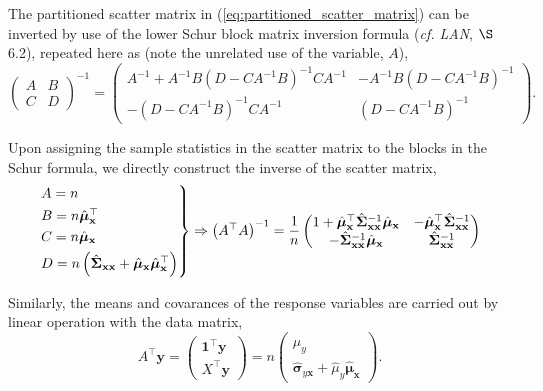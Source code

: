 \documentclass[12pt, twoside, draft]{article}
\begin{document}
The partitioned scatter matrix in (\ref{eq:partitioned_scatter_matrix}) can be inverted by use of the lower Schur block matrix inversion formula (\textit{cf. LAN}, $\S$6.2), repeated here as (note the unrelated use of the variable, $A$),
\begin{equation}\label{eq:block_matrix_inverse_lower}
\begin{pmatrix}
A & B \\
C & D
\end{pmatrix}^{-1} = 
\begin{pmatrix}
A^{-1} + A^{-1}B \left( D - CA^{-1}B \right)^{-1} CA^{-1} & -A^{-1}B \left( D - CA^{-1}B \right)^{-1} \\
-\left( D - CA^{-1}B \right)^{-1}CA^{-1} & \left( D - CA^{-1}B \right)^{-1}
\end{pmatrix}.
\end{equation}

Upon assigning the sample statistics in the scatter matrix to the blocks in the Schur formula, we directly construct the inverse of the scatter matrix,
\begin{equation}
\begin{rcases}
A = n \\
B = n \hat{\boldsymbol{\mu}}^\top_{\mathbf{x}} \\
C = n \hat{\boldsymbol{\mu}}_{\mathbf{x}} \\
D = n \left(\hat{\boldsymbol{\Sigma}}_{\mathbf{x}\mathbf{x}} +  \hat{\boldsymbol{\mu}}_{\mathbf{x}}\hat{\boldsymbol{\mu}}^\top_{\mathbf{x}} \right)
\end{rcases} \Rightarrow
\begin{pmatrix}
A^\top A
\end{pmatrix}^{-1}
= \frac{1}{n}
\begin{pmatrix}
1 + \hat{\boldsymbol{\mu}}^\top_{\mathbf{x}}\hat{\boldsymbol{\Sigma}}_{\mathbf{x}\mathbf{x}}^{-1} \hat{\boldsymbol{\mu}}_{\mathbf{x}} & -\hat{\boldsymbol{\mu}}^\top_{\mathbf{x}}\hat{\boldsymbol{\Sigma}}_{\mathbf{x}\mathbf{x}}^{-1} \\
-\hat{\boldsymbol{\Sigma}}_{\mathbf{x}\mathbf{x}}^{-1} \hat{\boldsymbol{\mu}}_{\mathbf{x}} & \hat{\boldsymbol{\Sigma}}_{\mathbf{x}\mathbf{x}}^{-1}
\end{pmatrix}
\end{equation}

Similarly, the means and covarances of the response variables are carried out by linear operation with the data matrix,
\begin{equation}
A^\top \mathbf{y} = \begin{pmatrix} \mathbf{1}^\top \mathbf{y} \\ X^\top \mathbf{y} \end{pmatrix} = n
\begin{pmatrix} \hat{\mu}_y \\ \hat{\boldsymbol{\sigma}}_{y\mathbf{x}} + \hat{\mu}_y  \hat{\boldsymbol{\mu}}_{\mathbf{x}} \end{pmatrix}.
\end{equation}
\end{document}
